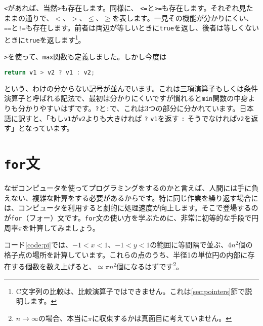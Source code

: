\texttt{<}があれば、当然\texttt{>}も存在します。同様に、 \texttt{<=}と\texttt{>=}も存在します。それぞれ見たままの通りで、$<$、$>$、$\le$、$\ge$を表します。一見その機能が分かりにくい、\texttt{==}と\texttt{!=}も存在します。前者は両辺が等しいときに\texttt{true}を返し、後者は等しくないときに\texttt{true}を返します\footnote{C文字列の比較は、比較演算子ではできません。これは\ref{sec:pointers}節で説明します。}。

\texttt{>}を使って、\texttt{max}関数も定義しました。しかし今度は
\begin{lstlisting}[language=c++]
  return v1 > v2 ? v1 : v2;
\end{lstlisting}
という、わけの分からない記号が並んでいます。これは三項演算子もしくは条件演算子と呼ばれる記法で、最初は分かりにくいですが慣れると\texttt{min}関数の中身よりも分かりやすいはずです。\texttt{?}と\texttt{:}で、これは3つの部分に分かれています。日本語に訳すと、「もし\texttt{v1}が\texttt{v2}よりも大きければ \texttt{?} \texttt{v1}を返す \texttt{:} そうでなければ\texttt{v2}を返す」となっています。

\section{\texttt{for}文}

なぜコンピュータを使ってプログラミングをするのかと言えば、人間には手に負えない、複雑な計算をする必要があるからです。特に同じ作業を繰り返す場合には、コンピュータを利用すると劇的に処理速度が向上します。そこで登場するのが\texttt{for}（フォー）文です。\texttt{for}文の使い方を学ぶために、非常に初等的な手段で円周率$\pi$を計算してみましょう。



コード\ref{code:pi}では、$-1<x<1$、$-1<y<1$の範囲に等間隔で並ぶ、$4n^2$個の格子点の場所を計算しています。これらの点のうち、半径1の単位円の内部に存在する個数を数え上げると、$\simeq\pi n^2$個になるはずです\footnote{$n\rightarrow\infty$の場合、本当に$\pi$に収束するかは真面目に考えていません。}。


